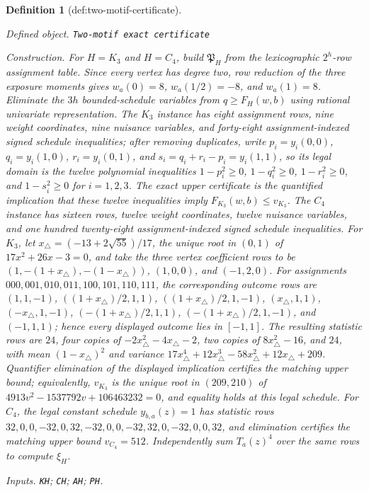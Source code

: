\documentclass{article}
\newtheorem{definition}{Definition}
\begin{document}
\begin{definition}[def:two-motif-certificate]\label{def:two-motif-certificate}
\par\smallskip\noindent\emph{Defined object.} \texttt{Two-\allowbreak{}motif exact certificate}
\par\smallskip\noindent\emph{Construction.} For \(H=K_3\) and \(H=C_4\), build \(\mathfrak P_H\) from the lexicographic \(2^h\)-row assignment table. Since every vertex has degree two, row reduction of the three exposure moments gives \(w_a(0)=8\), \(w_a(1/2)=-8\), and \(w_a(1)=8\). Eliminate the \(3h\) bounded-schedule variables from \(q\ge F_H(w,b)\) using rational univariate representation. The \(K_3\) instance has eight assignment rows, nine weight coordinates, nine nuisance variables, and forty-eight assignment-indexed signed schedule inequalities; after removing duplicates, write \(p_i=y_i(0,0)\), \(q_i=y_i(1,0)\), \(r_i=y_i(0,1)\), and \(s_i=q_i+r_i-p_i=y_i(1,1)\), so its legal domain is the twelve polynomial inequalities \(1-p_i^2\ge0\), \(1-q_i^2\ge0\), \(1-r_i^2\ge0\), and \(1-s_i^2\ge0\) for \(i=1,2,3\). The exact upper certificate is the quantified implication that these twelve inequalities imply \(F_{K_3}(w,b)\le v_{K_3}\). The \(C_4\) instance has sixteen rows, twelve weight coordinates, twelve nuisance variables, and one hundred twenty-eight assignment-indexed signed schedule inequalities. For \(K_3\), let \(x_\triangle=(-13+2\sqrt{55})/17\), the unique root in \((0,1)\) of \(17x^2+26x-3=0\), and take the three vertex coefficient rows to be \((1,-(1+x_\triangle),-(1-x_\triangle))\), \((1,0,0)\), and \((-1,2,0)\). For assignments \(000,001,010,011,100,101,110,111\), the corresponding outcome rows are \((1,1,-1)\), \(((1+x_\triangle)/2,1,1)\), \(((1+x_\triangle)/2,1,-1)\), \((x_\triangle,1,1)\), \((-x_\triangle,1,-1)\), \((-(1+x_\triangle)/2,1,1)\), \((-(1+x_\triangle)/2,1,-1)\), and \((-1,1,1)\); hence every displayed outcome lies in \([-1,1]\). The resulting statistic rows are \(24\), four copies of \(-2x_\triangle^2-4x_\triangle-2\), two copies of \(8x_\triangle^2-16\), and \(24\), with mean \((1-x_\triangle)^2\) and variance \(17x_\triangle^4+12x_\triangle^3-58x_\triangle^2+12x_\triangle+209\). Quantifier elimination of the displayed implication certifies the matching upper bound; equivalently, \(v_{K_3}\) is the unique root in \((209,210)\) of \(4913v^2-1537792v+106463232=0\), and equality holds at this legal schedule. For \(C_4\), the legal constant schedule \(y_{b,a}(z)=1\) has statistic rows \(32,0,0,-32,0,32,-32,0,0,-32,32,0,-32,0,0,32\), and elimination certifies the matching upper bound \(v_{C_4}=512\). Independently sum \(T_a(z)^4\) over the same rows to compute \(\xi_H\).
\par\smallskip\noindent\emph{Inputs.} \texttt{KH}; \texttt{CH}; \texttt{AH}; \texttt{PH}.
\end{definition}
\end{document}
